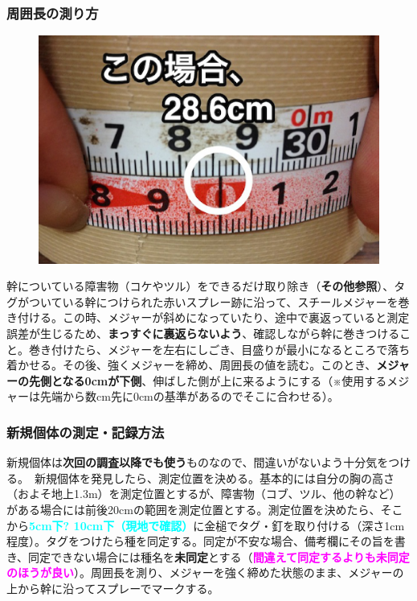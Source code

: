 \documentclass[12pt,a4paper]{extarticle}
\newcommand{\point}[1]
{\textbf{\textcolor{magenta}{#1}}}
\newcommand{\conf}[1]
{\textbf{\textcolor{cyan}{#1}}}
\begin{document}
\newpage
\begin{mdframed}[style=exampledefault,roundcorner=5]\small{
\subsubsection*{周囲長の測り方}

\begin{figure}
\includegraphics[scale=0.24]{../Images/measure.eps}
\end{figure}

幹についている障害物（コケやツル）をできるだけ取り除き（\textbf{その他参照}）、タグがついている幹につけられた赤いスプレー跡に沿って、スチールメジャーを巻き付ける。この時、メジャーが斜めになっていたり、途中で裏返っていると測定誤差が生じるため、\textbf{まっすぐに裏返らないよう}、確認しながら幹に巻きつけること。巻き付けたら、メジャーを左右にしごき、目盛りが最小になるところで落ち着かせる。その後、強くメジャーを締め、周囲長の値を読む。このとき、\textbf{メジャーの先側となる0cmが下側}、伸ばした側が上に来るようにする（※使用するメジャーは先端から数cm先に0cmの基準があるのでそこに合わせる）。

}\end{mdframed}

\begin{mdframed}[style=exampledefault,roundcorner=5]\small{
\subsubsection*{新規個体の測定・記録方法}

新規個体は\textbf{次回の調査以降でも使う}ものなので、間違いがないよう十分気をつける。　新規個体を発見したら、測定位置を決める。基本的には自分の胸の高さ（およそ地上1.3m）を測定位置とするが、障害物（コブ、ツル、他の幹など）がある場合には前後20cmの範囲を測定位置とする。測定位置を決めたら、そこから\conf{5cm下? 10cm下（現地で確認）}に金槌でタグ・釘を取り付ける（深さ1cm程度）。タグをつけたら種を同定する。同定が不安な場合、備考欄にその旨を書き、同定できない場合には種名を\textbf{未同定}とする（\point{間違えて同定するよりも未同定のほうが良い}）。周囲長を測り、メジャーを強く締めた状態のまま、メジャーの上から幹に沿ってスプレーでマークする。

}\end{mdframed}
\end{document}
